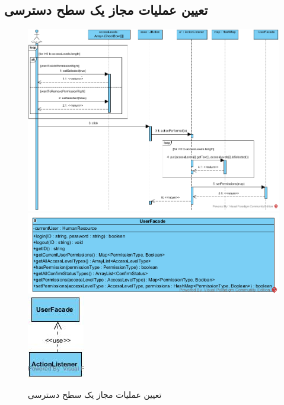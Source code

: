 \begin{landscape}
\section{تعیین عملیات مجاز یک سطح دسترسی}
\begin{figure}[H]
	\centering
	\includegraphics[scale=0.7]{img/sequence-design/SetPermissions}
	\includegraphics[scale=0.7]{img/sequence-design/SetPermissionsC}
	\includegraphics[scale=0.7]{img/sequence-design/SetPermissionsUI}
	\caption{تعیین عملیات مجاز یک سطح دسترسی}
\end{figure}

\newpage

\end{landscape}
